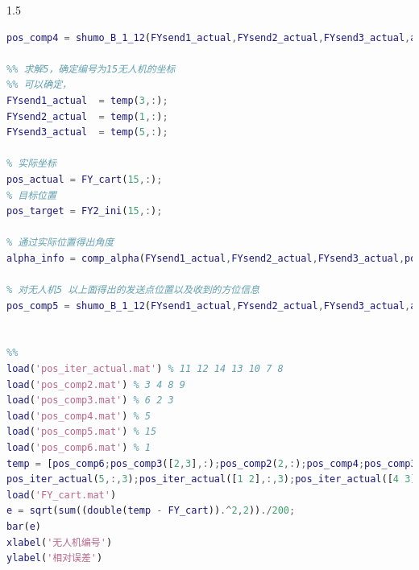 \documentclass[12pt]{ctexart}
\begin{document}
\begin{spacing}{1.5}
\begin{lstlisting}[title="shumo\_B\_222.m",language=matlab]
% 对无人机5 以上面得出的发送点位置以及收到的方位信息
pos_comp4 = shumo_B_1_12(FYsend1_actual,FYsend2_actual,FYsend3_actual,alpha_info(1),alpha_info(2),alpha_info(3),pos_target);

%% 求解5，确定编号为15无人机的坐标
%% 可以确定，
FYsend1_actual  = temp(3,:);
FYsend2_actual  = temp(1,:);
FYsend3_actual  = temp(5,:);

% 实际坐标
pos_actual = FY_cart(15,:);
% 目标位置
pos_target = FY2_ini(15,:);

% 通过实际位置得出角度
alpha_info = comp_alpha(FYsend1_actual,FYsend2_actual,FYsend3_actual,pos_actual);

% 对无人机5 以上面得出的发送点位置以及收到的方位信息
pos_comp5 = shumo_B_1_12(FYsend1_actual,FYsend2_actual,FYsend3_actual,alpha_info(1),alpha_info(2),alpha_info(3),pos_target);


%%
load('pos_iter_actual.mat') % 11 12 14 13 10 7 8
load('pos_comp2.mat') % 3 4 8 9
load('pos_comp3.mat') % 6 2 3
load('pos_comp4.mat') % 5
load('pos_comp5.mat') % 15
load('pos_comp6.mat') % 1
temp = [pos_comp6;pos_comp3([2,3],:);pos_comp2(2,:);pos_comp4;pos_comp3(1,:);pos_iter_actual([6 7],:,3);pos_comp2(4,:);
pos_iter_actual(5,:,3);pos_iter_actual([1 2],:,3);pos_iter_actual([4 3],:,3);pos_comp5];
load('FY_cart.mat')
e = sqrt(sum((double(temp - FY_cart)).^2,2))./200;
bar(e)
xlabel('无人机编号')
ylabel('相对误差')

\end{lstlisting}

\end{spacing}	
\end{document}
